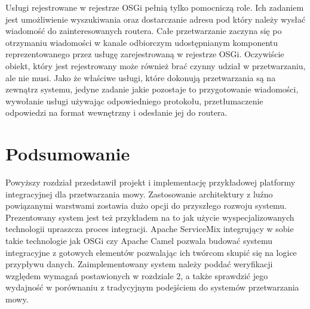 Usługi rejestrowane w rejestrze OSGi pełnią tylko pomocniczą role. Ich zadaniem jest umożliwienie wyszukiwania oraz dostarczanie adresu pod który należy wysłać wiadomość do zainteresowanych routera. Całe przetwarzanie zaczyna się po otrzymaniu wiadomości w kanale odbiorczym udostępnianym komponentu reprezentowanego przez usługę zarejestrowaną w rejestrze OSGi. Oczywiście obiekt, który jest rejestrowany może również brać czynny udział w przetwarzaniu, ale nie musi. Jako że właściwe usługi, które dokonują przetwarzania są na zewnątrz systemu, jedyne zadanie jakie pozostaje to przygotowanie wiadomości, wywołanie usługi używając odpowiedniego protokołu, przetłumaczenie odpowiedzi na format wewnętrzny i odesłanie jej do routera. 



\section*{Podsumowanie} 

Powyższy rozdział przedstawił projekt i implementację przykładowej platformy integracyjnej dla przetwarzania mowy. Zastosowanie architektury z luźno powiązanymi warstwami zostawia dużo opcji do przyszłego rozwoju systemu. Prezentowany system jest też przykładem na to jak użycie wyspecjalizowanych technologii upraszcza proces integracji. Apache ServiceMix integrujący w sobie takie technologie jak OSGi czy Apache Camel pozwala budować systemu integracyjne z gotowych elementów pozwalając ich twórcom skupić się na logice przypływu danych. Zaimplementowany system należy poddać weryfikacji względem wymagań postawionych w rozdziale 2, a także sprawdzić jego wydajność w porównaniu z tradycyjnym podejściem do systemów przetwarzania mowy.








